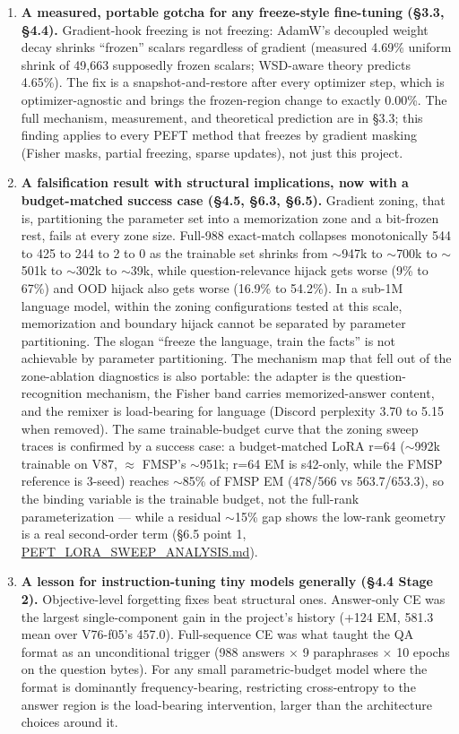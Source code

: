 \documentclass[11pt]{article}
\begin{document}
\begin{enumerate}
\item \textbf{A measured, portable gotcha for any freeze-style fine-tuning (\S3.3, \S4.4).} Gradient-hook freezing is not freezing: AdamW's decoupled weight decay shrinks ``frozen'' scalars regardless of gradient (measured 4.69\% uniform shrink of 49{,}663 supposedly frozen scalars; WSD-aware theory predicts 4.65\%). The fix is a snapshot-and-restore after every optimizer step, which is optimizer-agnostic and brings the frozen-region change to exactly 0.00\%. The full mechanism, measurement, and theoretical prediction are in \S3.3; this finding applies to every PEFT method that freezes by gradient masking (Fisher masks, partial freezing, sparse updates), not just this project.

\item \textbf{A falsification result with structural implications, now with a budget-matched success case (\S4.5, \S6.3, \S6.5).} Gradient zoning, that is, partitioning the parameter set into a memorization zone and a bit-frozen rest, fails at every zone size. Full-988 exact-match collapses monotonically 544 to 425 to 244 to 2 to 0 as the trainable set shrinks from $\sim$947k to $\sim$700k to $\sim$501k to $\sim$302k to $\sim$39k, while question-relevance hijack gets worse (9\% to 67\%) and OOD hijack also gets worse (16.9\% to 54.2\%). In a sub-1M language model, within the zoning configurations tested at this scale, memorization and boundary hijack cannot be separated by parameter partitioning. The slogan ``freeze the language, train the facts'' is not achievable by parameter partitioning. The mechanism map that fell out of the zone-ablation diagnostics is also portable: the adapter is the question-recognition mechanism, the Fisher band carries memorized-answer content, and the remixer is load-bearing for language (Discord perplexity 3.70 to 5.15 when removed). The same trainable-budget curve that the zoning sweep traces is confirmed by a success case: a budget-matched LoRA r=64 ($\sim$992k trainable on V87, $\approx$ FMSP's $\sim$951k; r=64 EM is s42-only, while the FMSP reference is 3-seed) reaches $\sim$85\% of FMSP EM (478/566 vs 563.7/653.3), so the binding variable is the trainable budget, not the full-rank parameterization --- while a residual $\sim$15\% gap shows the low-rank geometry is a real second-order term (\S6.5 point 1, \href{https://github.com/llaa33219/MicroMixer-4/blob/4bb630413dfa58ef3141291e121ab8c006d03235/PEFT_LORA_SWEEP_ANALYSIS.md}{PEFT\_LORA\_SWEEP\_ANALYSIS.md}).

\item \textbf{A lesson for instruction-tuning tiny models generally (\S4.4 Stage 2).} Objective-level forgetting fixes beat structural ones. Answer-only CE was the largest single-component gain in the project's history (+124 EM, 581.3 mean over V76-f05's 457.0). Full-sequence CE was what taught the QA format as an unconditional trigger (988 answers $\times$ 9 paraphrases $\times$ 10 epochs on the question bytes). For any small parametric-budget model where the format is dominantly frequency-bearing, restricting cross-entropy to the answer region is the load-bearing intervention, larger than the architecture choices around it.


\end{enumerate}
\end{document}
